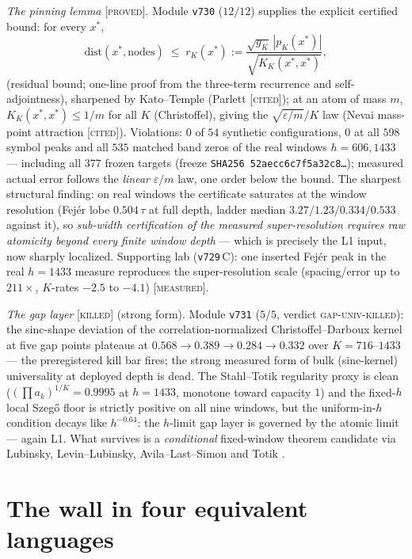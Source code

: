 \documentclass[11pt,a4paper]{article}
\theoremstyle{remark}
\newcommand{\PROVED}{\textnormal{[\textsc{proved}]}}
\newcommand{\MEASURED}{\textnormal{[\textsc{measured}]}}
\newcommand{\KILLED}{\textnormal{[\textsc{killed}]}}
\newcommand{\CITED}{\textnormal{[\textsc{cited}]}}
\begin{document}
\emph{The pinning lemma} \PROVED.  Module \texttt{v730} ($12/12$)
supplies the explicit certified bound: for every $x^*$,
\[
\mathrm{dist}(x^*,\text{nodes})\;\le\;
r_K(x^*):=\frac{\sqrt{g_K}\,|p_K(x^*)|}{\sqrt{K_K(x^*,x^*)}},
\]
(residual bound; one-line proof from the three-term recurrence and
self-adjointness), sharpened by Kato--Temple (Parlett \CITED); at an
atom of mass $m$, $K_K(x^*,x^*)\le1/m$ for all $K$ (Christoffel),
giving the $\sqrt{\varepsilon/m}/K$ law (Nevai mass-point attraction
\CITED).  Violations: $0$ of $54$ synthetic configurations, $0$ at
all $598$ symbol peaks and all $535$ matched band zeros of the real
windows $h=606,1433$ --- including all $377$ frozen targets
(freeze \texttt{SHA256 52aecc6c7f5a32c8\ldots}); measured actual
error follows the \emph{linear} $\varepsilon/m$ law, one order below
the bound.  The sharpest structural finding: on real windows the
certificate saturates at the window resolution (Fej\'er lobe
$0.504\,\tau$ at full depth, ladder median $3.27/1.23/0.334/0.533$
against it), so \emph{sub-width certification of the measured
super-resolution requires raw atomicity beyond every finite window
depth} --- which is precisely the L1 input, now sharply localized.
Supporting lab (\texttt{v729}\,C): one inserted Fej\'er peak in the
real $h=1433$ measure reproduces the super-resolution scale
(spacing/error up to $211\times$, $K$-rates $-2.5$ to $-4.1$)
\MEASURED.

\emph{The gap layer} \KILLED{} (strong form).  Module \texttt{v731}
($5/5$, verdict \textsc{gap-univ-killed}): the sinc-shape deviation
of the correlation-normalized Christoffel--Darboux kernel at five
gap points plateaus at $0.568\to0.389\to0.284\to0.332$ over
$K=716$--$1433$ --- the preregistered kill bar fires; the strong
measured form of bulk (sine-kernel) universality at deployed depth
is dead.  The Stahl--Totik regularity proxy is clean
($(\prod a_k)^{1/K}=0.9995$ at $h=1433$, monotone toward capacity
$1$) and the fixed-$h$ local Szeg\H o floor is strictly positive on
all nine windows, but the uniform-in-$h$ condition decays like
$h^{-0.64}$: the $h$-limit gap layer is governed by the atomic limit
--- again L1.  What survives is a \emph{conditional} fixed-window
theorem candidate via Lubinsky, Levin--Lubinsky, Avila--Last--Simon
and Totik \cite{Lub09,LL08,ALS10,Totik09}.

\section{The wall in four equivalent languages}\label{sec:wall}
\end{document}
